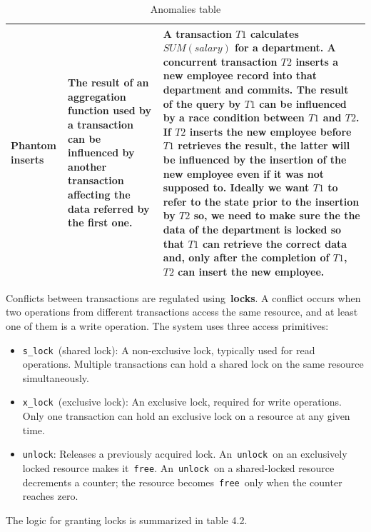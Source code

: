 \documentclass{scrbook}
\begin{document}
\begin{table}
\begin{tabularx}{\textwidth}{|p{2.8cm}|X|X|}
        \textbf{Phantom inserts} &
        The result of an aggregation function used by a transaction can be influenced by another transaction affecting the data referred by the first one. &
        A transaction $T1$ calculates $SUM(salary)$ for a department. A concurrent transaction $T2$ inserts a new employee record into that department and commits. The result of the query by $T1$ can be influenced by a race condition between $T1$ and $T2$. If $T2$ inserts the new employee before $T1$ retrieves the result, the latter will be influenced by the insertion of the new employee even if it was not supposed to. Ideally we
        want $T1$ to refer to the state prior to the insertion by
        $T2$ so, we need to make sure the the data of the department is
        locked so that $T1$ can retrieve the correct data and, only after the completion of $T1$, $T2$ can insert the new employee. \\ \hline
    \end{tabularx}
    \caption{Anomalies table}
\end{table}

Conflicts between transactions are regulated using~\textbf{locks}. A
conflict occurs when two operations from different transactions access
the same resource, and at least one of them is a write operation. The
system uses three access primitives:

\begin{itemize}
\item
  \texttt{s\_lock}~(shared lock): A non-exclusive lock, typically used
  for read operations. Multiple transactions can hold a shared lock on
  the same resource simultaneously.
\item
  \texttt{x\_lock}~(exclusive lock): An exclusive lock, required for
  write operations. Only one transaction can hold an exclusive lock on a
  resource at any given time.
\item
  \texttt{unlock}: Releases a previously acquired lock.
  An~\texttt{unlock}~on an exclusively locked resource makes
  it~\texttt{free}. An~\texttt{unlock}~on a shared-locked resource
  decrements a counter; the resource becomes~\texttt{free}~only when the
  counter reaches zero.
\end{itemize}

The logic for granting locks is summarized in table 4.2.\\
\end{document}
